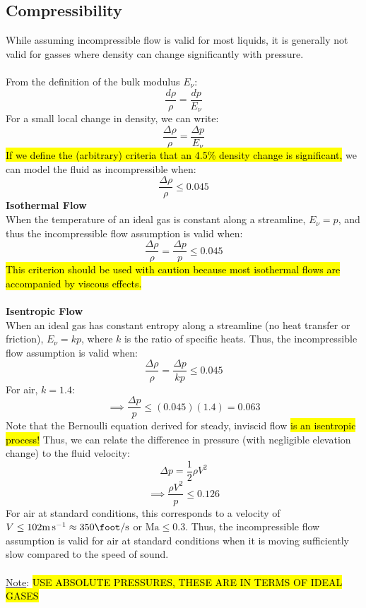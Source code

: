 ﻿\documentclass[12pt]{article}
\begin{document}
\subsection*{Compressibility}
While assuming incompressible flow is valid for most liquids, it is generally not valid for gasses where density can change significantly with pressure.\\\\
From the definition of the bulk modulus $E_\nu$:
\[\frac{d\rho}{\rho} = \frac{dp}{E_\nu}\]
For a small local change in density, we can write:
\[\frac{\Delta \rho}{\rho} = \frac{\Delta p}{E_\nu}\]
\hl{If we define the (arbitrary) criteria that an 4.5\% density change is significant,} we can model the fluid as incompressible when:
\[\frac{\Delta \rho}{\rho} \leq 0.045\]
\textbf{Isothermal Flow}\\
When the temperature of an ideal gas is constant along a streamline, $E_\nu = p$, and thus the incompressible flow assumption is valid when:
\[\frac{\Delta \rho}{\rho} = \frac{\Delta p}{p} \leq 0.045\]
\hl{This criterion should be used with caution because most isothermal flows are accompanied by viscous effects.}\\\\
\textbf{Isentropic Flow}\\
When an ideal gas has constant entropy along a streamline (no heat transfer or friction), $E_\nu = kp$, where $k$ is the ratio of specific heats. Thus, the incompressible flow assumption is valid when:
\[\frac{\Delta \rho}{\rho} = \frac{\Delta p}{kp} \leq 0.045\]
For air, $k = 1.4$:
\[\implies \frac{\Delta p}{p} \leq (0.045)(1.4) = 0.063\]
Note that the Bernoulli equation derived for steady, inviscid flow \hl{is an isentropic process!} Thus, we can relate the difference in pressure (with negligible elevation change) to the fluid velocity:
\[\Delta p = \frac{1}{2}\rho V^2\]
\[\implies \frac{\rho V^2}{p} \leq 0.126\]
For air at standard conditions, this corresponds to a velocity of $V \leq 102 \unit{\meter\per\second} \approx 350 \unit{\foot \per \second}$ or $\text{Ma} \leq 0.3$. Thus, the incompressible flow assumption is valid for air at standard conditions when it is moving sufficiently slow compared to the speed of sound.\\\\
\underline{Note}: \hl{USE ABSOLUTE PRESSURES, THESE ARE IN TERMS OF IDEAL GASES}
\end{document}
